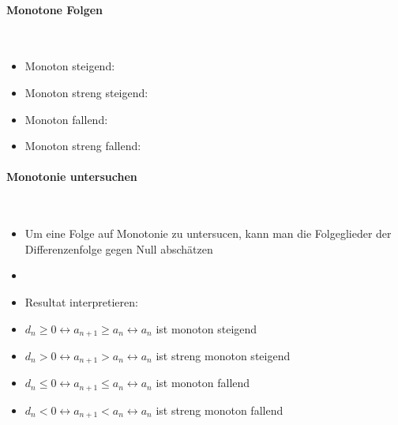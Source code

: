 \paragraph{Monotone Folgen}\mbox{}\\
\begin{itemize}
    \item Monoton steigend: 
    \item Monoton streng steigend: 
    \item Monoton fallend: 
    \item Monoton streng fallend: 
\end{itemize}
\vspace{1mm}

\paragraph{Monotonie untersuchen}\mbox{}\\
\begin{itemize}
    \item Um eine Folge auf Monotonie zu untersucen, kann man die Folgeglieder der Differenzenfolge gegen Null abschätzen
    \item {}
    \item Resultat interpretieren:
    \item $d_n \geq 0 \leftrightarrow a_{n+1} \geq a_n \leftrightarrow a_n$ ist monoton steigend
    \item $d_n > 0 \leftrightarrow a_{n+1} > a_n \leftrightarrow a_n$ ist streng monoton steigend
    \item $d_n \leq 0 \leftrightarrow a_{n+1} \leq a_n \leftrightarrow a_n$ ist monoton fallend
    \item $d_n < 0 \leftrightarrow a_{n+1} < a_n \leftrightarrow a_n$ ist streng monoton fallend
\end{itemize}
\vspace{1mm}